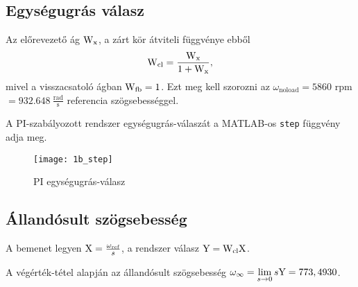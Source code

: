 
\subsection{Egységugrás válasz}

Az előrevezető ág $\mathrm{W}_\text{x}$, a zárt kör átviteli függvénye ebből
\begin{equation}
	\mathrm{W}_\text{cl} = \frac{\mathrm{W}_\text{x}}{1+\mathrm{W}_\text{x}},
\end{equation}
mivel a visszacsatoló ágban $\mathrm{W}_\text{fb}=1$.
Ezt meg kell szorozni az $\omega_\text{noload} = 5860$ rpm $ = 932.648~\frac{\text{rad}}{\text{s}} $ referencia szögsebességgel.

A PI-szabályozott rendszer egységugrás-válaszát a MATLAB-os \verb|step| függvény adja meg.
\begin{figure}[H]
	\centering
	\texttt{[image: 1b\_step]}
	\caption{PI egységugrás-válasz}
	\label{fig:1b_step}
\end{figure}


\subsection{Állandósult szögsebesség}

A bemenet legyen $\mathrm{X} = \frac{\omega_\text{ref}}{s}$, a rendszer válasz $\mathrm{Y} = \mathrm{W}_\text{cl}\mathrm{X}$.

A végérték-tétel alapján az állandósult szögsebesség $\omega_\infty = \lim\limits_{s\rightarrow 0}s\mathrm{Y} = 773,4930$.

